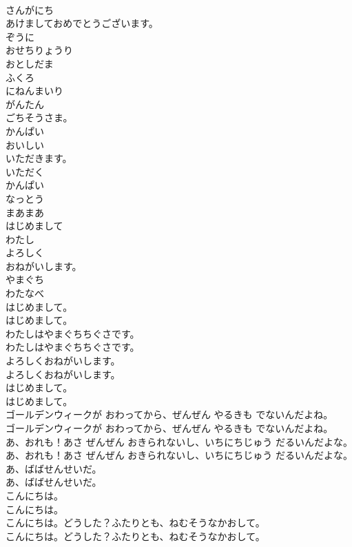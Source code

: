 \documentclass[8pt]{extreport}
\begin{document}
\begin{CJK}{UTF8}{min}
\\	さんがにち
\\	あけましておめでとうございます。
\\	ぞうに
\\	おせちりょうり
\\	おとしだま
\\	ふくろ
\\	にねんまいり
\\	がんたん
\\	ごちそうさま。
\\	かんぱい
\\	おいしい
\\	いただきます。
\\	いただく
\\	かんぱい
\\	なっとう
\\	まあまあ
\\	はじめまして
\\	わたし
\\	よろしく
\\	おねがいします。
\\	やまぐち
\\	わたなべ
\\	はじめまして。
\\	はじめまして。
\\	わたしはやまぐちちぐさです。
\\	わたしはやまぐちちぐさです。
\\	よろしくおねがいします。
\\	よろしくおねがいします。
\\	はじめまして。
\\	はじめまして。
\\	ゴールデンウィークが おわってから、ぜんぜん やるきも でないんだよね。
\\	ゴールデンウィークが おわってから、ぜんぜん やるきも でないんだよね。
\\	あ、おれも！あさ ぜんぜん おきられないし、いちにちじゅう だるいんだよな。
\\	あ、おれも！あさ ぜんぜん おきられないし、いちにちじゅう だるいんだよな。
\\	あ、ばばせんせいだ。
\\	あ、ばばせんせいだ。
\\	こんにちは。
\\	こんにちは。
\\	こんにちは。どうした？ふたりとも、ねむそうなかおして。
\\	こんにちは。どうした？ふたりとも、ねむそうなかおして。

\end{CJK}
\end{document}

